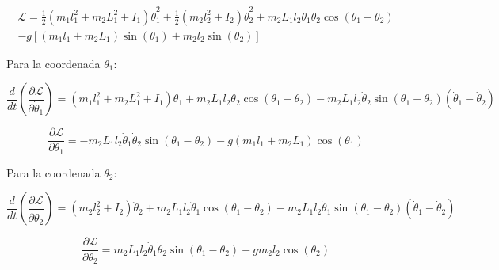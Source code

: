 \begin{multline}
\mathcal{L} = \frac{1}{2}(m_1l_1^2 + m_2L_1^2 + I_1)\dot{\theta}_1^2 + \frac{1}{2}(m_2l_2^2 + I_2)\dot{\theta}_2^2 + m_2L_1l_2\dot{\theta}_1\dot{\theta}_2\cos(\theta_1 - \theta_2) \\
- g[(m_1l_1 + m_2L_1)\sin(\theta_1) + m_2l_2\sin(\theta_2)]
\end{multline}

Para la coordenada $\theta_1$:



\begin{equation}
\frac{d}{dt}\left(\frac{\partial \mathcal{L}}{\partial \dot{\theta}_1}\right) = (m_1l_1^2 + m_2L_1^2 + I_1)\ddot{\theta}_1 + m_2L_1l_2\ddot{\theta}_2\cos(\theta_1 - \theta_2) - m_2L_1l_2\dot{\theta}_2\sin(\theta_1 - \theta_2)(\dot{\theta}_1 - \dot{\theta}_2)
\end{equation}

\begin{equation}
\frac{\partial \mathcal{L}}{\partial \theta_1} = -m_2L_1l_2\dot{\theta}_1\dot{\theta}_2\sin(\theta_1 - \theta_2) - g(m_1l_1 + m_2L_1)\cos(\theta_1)
\end{equation}

Para la coordenada $\theta_2$:


\begin{equation}
\frac{d}{dt}\left(\frac{\partial \mathcal{L}}{\partial \dot{\theta}_2}\right) = (m_2l_2^2 + I_2)\ddot{\theta}_2 + m_2L_1l_2\ddot{\theta}_1\cos(\theta_1 - \theta_2) - m_2L_1l_2\dot{\theta}_1\sin(\theta_1 - \theta_2)(\dot{\theta}_1 - \dot{\theta}_2)
\end{equation}

\begin{equation}
\frac{\partial \mathcal{L}}{\partial \theta_2} = m_2L_1l_2\dot{\theta}_1\dot{\theta}_2\sin(\theta_1 - \theta_2) - gm_2l_2\cos(\theta_2)
\end{equation}

